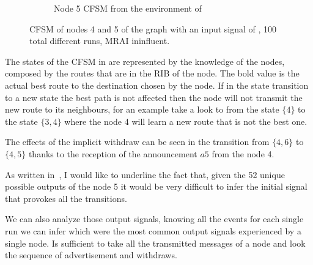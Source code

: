\begin{figure}[h]
\begin{subfigure}[b]{0.49\textwidth}
		 \caption{Node \num{5} \ac{CFSM} from the environment of }
         \label{fig:fsm_node5}
     \end{subfigure}
		\caption{\ac{CFSM} of nodes \num{4} and \num{5} of the graph
			 with an input signal of ,
			\num{100} total different runs, \ac{MRAI} ininfluent.
			}
        \label{fig:fsm_griffin_fig4}
\end{figure}

The states of the \ac{CFSM} in  are represented by the
knowledge of the nodes, composed by the routes that are in the \ac{RIB} of the node.
The bold value is the actual best route to the destination chosen by the node.
If in the state transition to a new state the best path is not affected then the
node will not transmit the new route to its neighbours, for an example take
a look to  from the state $\{4\}$ to the state $\{3, 4\}$
where the node \num{4} will learn a new route that is not the best one.

The effects of the implicit withdraw can be seen in 
the transition from $\{4, 6\}$ to $\{4, 5\}$ thanks to the reception of the
announcement $a5$ from the node \num{4}.

As written in~\cite{griffinFSM}, I would like to underline the fact that, given
the \num{52} unique possible outputs of the node \num{5} it would be very difficult
to infer the initial signal that provokes all the transitions.

We can also analyze those output signals, knowing all the events for each single
run we can infer which were the most common output signals experienced by a single node.
Is sufficient to take all the transmitted messages of a node and look the sequence
of advertisement and withdraws.

